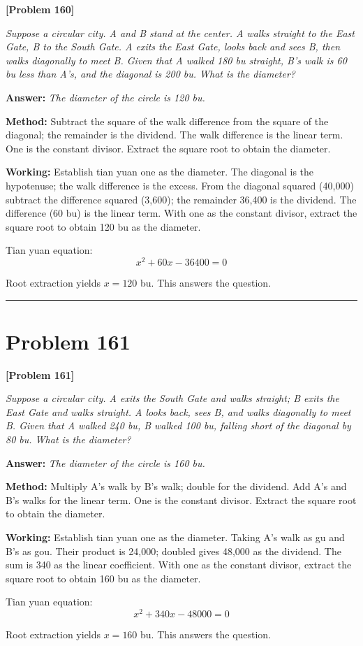 \documentclass[11pt,a4paper]{book}
\newcommand{\answer}[1]{\noindent\textbf{\color{anacolor}Answer: }\textit{#1}\par}
\newcommand{\method}[1]{\noindent\textbf{\color{methodcolor}Method: }#1\par}
\newcommand{\working}[1]{\noindent\textbf{\color{workcolor}Working: }#1\par}
\newcommand{\shortline}{\noindent\rule{0.5\textwidth}{0.4pt}\par}
\begin{document}
\noindent\textbf{\color{probcolor}[Problem 160]}

\textit{Suppose a circular city. A and B stand at the center. A walks straight to the East Gate, B to the South Gate. A exits the East Gate, looks back and sees B, then walks diagonally to meet B. Given that A walked 180 bu straight, B's walk is 60 bu less than A's, and the diagonal is 200 bu. What is the diameter?}

\answer{The diameter of the circle is 120 bu.}

\method{Subtract the square of the walk difference from the square of the diagonal; the remainder is the dividend. The walk difference is the linear term. One is the constant divisor. Extract the square root to obtain the diameter.}

\working{Establish tian yuan one as the diameter. The diagonal is the hypotenuse; the walk difference is the excess. From the diagonal squared (40,000) subtract the difference squared (3,600); the remainder 36,400 is the dividend. The difference (60 bu) is the linear term. With one as the constant divisor, extract the square root to obtain 120 bu as the diameter.

Tian yuan equation:
$$x^2 + 60x - 36400 = 0$$

Root extraction yields $x = 120$ bu. This answers the question.}

\shortline

\section{Problem 161}
\label{sec:prob161}

\noindent\textbf{\color{probcolor}[Problem 161]}

\textit{Suppose a circular city. A exits the South Gate and walks straight; B exits the East Gate and walks straight. A looks back, sees B, and walks diagonally to meet B. Given that A walked 240 bu, B walked 100 bu, falling short of the diagonal by 80 bu. What is the diameter?}

\answer{The diameter of the circle is 160 bu.}

\method{Multiply A's walk by B's walk; double for the dividend. Add A's and B's walks for the linear term. One is the constant divisor. Extract the square root to obtain the diameter.}

\working{Establish tian yuan one as the diameter. Taking A's walk as gu and B's as gou. Their product is 24,000; doubled gives 48,000 as the dividend. The sum is 340 as the linear coefficient. With one as the constant divisor, extract the square root to obtain 160 bu as the diameter.

Tian yuan equation:
$$x^2 + 340x - 48000 = 0$$

Root extraction yields $x = 160$ bu. This answers the question.}
\end{document}
